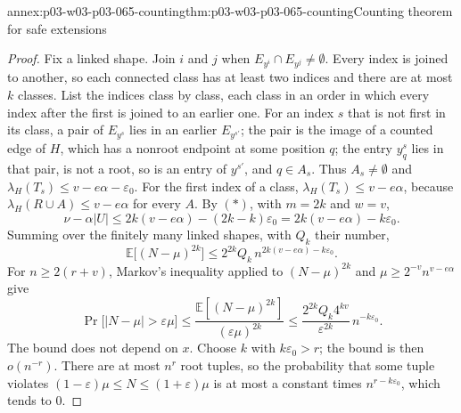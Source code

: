 \begin{annexitem}{annex:p03-w03-p03-065-counting}{thm:p03-w03-p03-065-counting}{Counting theorem for safe extensions}
\begin{proof}
Fix a linked shape.  Join \(i\) and \(j\) when \(E_{y^i}\cap
E_{y^j}\neq\emptyset\).  Every index is joined to another, so each connected
class has at least two indices and there are at most \(k\) classes.  List the
indices class by class, each class in an order in which every index after
the first is joined to an earlier one.  For an index \(s\) that is not first
in its class, a pair of \(E_{y^s}\) lies in an earlier \(E_{y^{s'}}\); the
pair is the image of a counted edge of \(H\), which has a nonroot endpoint at
some position \(q\); the entry \(y^s_q\) lies in that pair, is not a root, so
is an entry of \(y^{s'}\), and \(q\in A_s\).  Thus \(A_s\neq\emptyset\) and
\(\lambda_H(T_s)\leq v-e\alpha-\varepsilon_0\).  For the first index of a
class, \(\lambda_H(T_s)\leq v-e\alpha\), because \(\lambda_H(R\cup A)\leq
v-e\alpha\) for every \(A\).  By \((\ast)\), with \(m=2k\) and \(w=v\),
\[
  \nu-\alpha|U|\leq2k(v-e\alpha)-(2k-k)\varepsilon_0
  =2k(v-e\alpha)-k\varepsilon_0 .
\]
Summing over the finitely many linked shapes, with \(Q_k\) their number,
\[
  \mathbb E\bigl[(N-\mu)^{2k}\bigr]\leq2^{2k}Q_k\,n^{2k(v-e\alpha)-k\varepsilon_0}.
\]
For \(n\geq2(r+v)\), Markov's inequality applied to \((N-\mu)^{2k}\) and
\(\mu\geq2^{-v}n^{v-e\alpha}\) give
\[
  \Pr\bigl[|N-\mu|>\varepsilon\mu\bigr]
  \leq\frac{\mathbb E[(N-\mu)^{2k}]}{(\varepsilon\mu)^{2k}}
  \leq\frac{2^{2k}Q_k4^{kv}}{\varepsilon^{2k}}\,n^{-k\varepsilon_0}.
\]
The bound does not depend on \(x\).  Choose \(k\) with \(k\varepsilon_0>r\);
the bound is then \(o(n^{-r})\).  There are at most \(n^r\) root tuples, so the
probability that some tuple violates \((1-\varepsilon)\mu\leq N\leq
(1+\varepsilon)\mu\) is at most a constant times \(n^{r-k\varepsilon_0}\), which
tends to \(0\).
\end{proof}
\end{annexitem}

